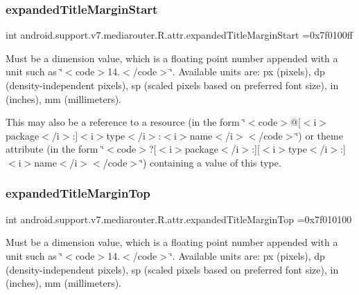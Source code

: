 \subsubsection{\texorpdfstring{expanded\+Title\+Margin\+Start}{expandedTitleMarginStart}}
{\footnotesize\ttfamily int android.\+support.\+v7.\+mediarouter.\+R.\+attr.\+expanded\+Title\+Margin\+Start =0x7f0100ff\hspace{0.3cm}{\ttfamily [static]}}

Must be a dimension value, which is a floating point number appended with a unit such as \char`\"{}$<$code$>$14.\+5sp$<$/code$>$\char`\"{}. Available units are\+: px (pixels), dp (density-\/independent pixels), sp (scaled pixels based on preferred font size), in (inches), mm (millimeters). 

This may also be a reference to a resource (in the form \char`\"{}$<$code$>$@\mbox{[}$<$i$>$package$<$/i$>$\+:\mbox{]}$<$i$>$type$<$/i$>$\+:$<$i$>$name$<$/i$>$$<$/code$>$\char`\"{}) or theme attribute (in the form \char`\"{}$<$code$>$?\mbox{[}$<$i$>$package$<$/i$>$\+:\mbox{]}\mbox{[}$<$i$>$type$<$/i$>$\+:\mbox{]}$<$i$>$name$<$/i$>$$<$/code$>$\char`\"{}) containing a value of this type. \mbox{\label{classandroid_1_1support_1_1v7_1_1mediarouter_1_1R_1_1attr_a929badf3e20735613d086893ef78582d}} 
\subsubsection{\texorpdfstring{expanded\+Title\+Margin\+Top}{expandedTitleMarginTop}}
{\footnotesize\ttfamily int android.\+support.\+v7.\+mediarouter.\+R.\+attr.\+expanded\+Title\+Margin\+Top =0x7f010100\hspace{0.3cm}{\ttfamily [static]}}

Must be a dimension value, which is a floating point number appended with a unit such as \char`\"{}$<$code$>$14.\+5sp$<$/code$>$\char`\"{}. Available units are\+: px (pixels), dp (density-\/independent pixels), sp (scaled pixels based on preferred font size), in (inches), mm (millimeters). 

